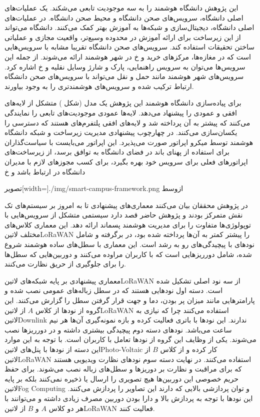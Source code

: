 این پژوهش دانشگاه هوشمند را به سه موجودیت تابعی می‌شکند. یک عملیات‌های اصلی دانشگاه، سرویس‌های صحن دانشگاه و محیط صحن دانشگاه.
در عملیات‌های اصلی دانشگاه، دیجیتال‌سازی و شبکه‌ها به آموزش بهتر کمک می‌کنند. دانشگاه می‌تواند از این زیرساخت برای ارائه آموزش در محدوده وسیع‌تر، واقعیت مجازی و عملیاتی ساختن تحقیقات استفاده کند.
سرویس‌های صحن دانشگاه تقریبا مشابه با سرویس‌هایی است که در مغازه‌ها، مرکزهای خرید و ‌خ در شهر هوشمند ارائه می‌شوند. از جمله این سرویس‌ها می‌توان به سرویس راهنمایی، پارک و شارژ وسایل نقلیه و ‌خ اشاره کرد.
سرویس‌های شهر هوشمند مانند حمل و نقل می‌تواند با سرویس‌های صحن دانشگاه ارتباط ترکیب شده و سرویس‌های هوشمند‌تری را به وجود بیاورند.

برای پیاده‌سازی دانشگاه هوشمند این پژوهش یک مدل (شکل ) متشکل از لایه‌های افقی و عمودی را پیشنهاد می‌دهد. لایه‌ها عمودی موجودیت‌های تابعی را نمایندگی می‌کنند که پیشتر به آن پرداخته شد و لایه‌های
افقی پلتفرم‌های هستند که دسترسی را یکسان‌سازی می‌کنند. در چهارچوب پیشنهادی مدیریت زیرساخت و شبکه دانشگاه هوشمند توسط میکرو اپراتور صورت می‌پذیرد. این اپراتور می‌بایست با سیاست‌گذاران برای استفاده از پهنای باند در فضای دانشگاه
به توافق برسد، از زیرساخت‌های اپراتورهای فعلی برای سرویس خود بهره بگیرد، برای کسب مجوزهای لازم با مدیران دانشگاه در ارتباط باشد و ‌خ

‌تصویر[width=\textwidth]{./img/smart-campus-framework.png}
‌ازوسط


در پژوهش  محققان بیان می‌کنند معماری‌های پیشنهادی تا به امروز بر سیستم‌های تک نقش متمرکز بودند و پژوهش حاضر قصد دارد سیستمی متشکل از سرویس‌هایی با توپولوژی‌ها متفاوت را
برای مدیریت هوشمند پسماند ارائه دهد. این معماری کلاس‌های مختلف ‌لاتین{LoRaWAN} را پیشتر کمتر به آن‌ها پرداخته شده بود، در برگرفته و شامل نودهای با پیچیدگی‌های رو به رشد است.
این معماری با سطل‌های ساده هوشمند شروع شده، شامل دورریزهایی است که با کاربران مراوده می‌کنند و دوربین‌هایی که سطل‌ها را برای جلوگیری از حریق نظارت می‌کنند.

معماری پیشنهادی بر پایه شبکه‌های ‌لاتین{LoRaWAN} از سه نود اصلی تشکیل شده است.
دسته اول نودهایی هستند که در سطل زباله‌های عمومی نصب شده و پارامترهایی مانند
میزان پر بودن، دما و جهت قرار گرفتن سطل را گزارش می‌کنند. این گروه از نودها از کلاس $A$ از ‌لاتین{LoRaWAN} استفاده می‌کنند چرا که نیازی به ‌لاتین{Downlink} ندارند.
این نودها با باتری فعالیت کرده و بازه نمونه‌گیری آن‌ها هر نیم ساعت می‌باشد.
نودهای دسته دوم پیچیدگی بیشتری داشته و در دورریزها نصب می‌شوند. یکی از وظایف این گروه از نودها تعامل با کاربران است.
با توجه به این موارد این دسته از نودها با پنل‌های ‌لاتین{Photo-Voltaic} کار کرده و
از کلاس $B$ از ‌لاتین{LoRaWAN} استفاده می‌کنند.
در نهایت دسته سوم نودهای نظارت ویدیویی هستند که برای مراقبت و نظارت بر دوریزها و سطل‌های زباله نصب می‌شوند. برای حفظ حریم خصوصی این دوربین‌ها هیچ تصویری را ارسال یا ذخیره نمی‌کنند
بلکه بر پایه ‌لاتین{Fog Computing} و توان پردازشی بالایی که دارند این تصاویر را پردازش می‌کنند.
این نودها با توجه به پردازش بالا و دارا بودن دوربین مصرف زیادی داشته و می‌توانند با هر دو کلاس $A$ و $B$ از ‌لاتین{LoRaWAN} فعالیت کنند.

